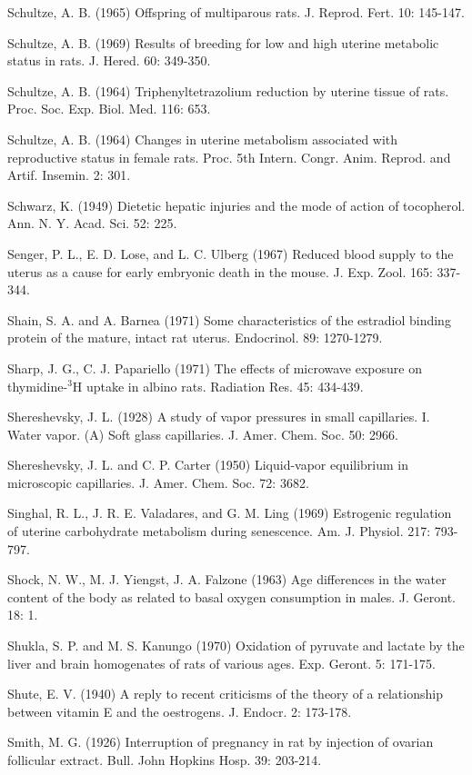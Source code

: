 Schultze, A. B. (1965) Offspring of multiparous rats. J. Reprod. Fert. 10: 145-147.

Schultze, A. B. (1969) Results of breeding for low and high uterine metabolic status in rats. J. Hered. 60: 349-350.

Schultze, A. B. (1964) Triphenyltetrazolium reduction by uterine tissue of rats. Proc. Soc. Exp. Biol. Med. 116: 653.

Schultze, A. B. (1964) Changes in uterine metabolism associated with reproductive status in female rats. Proc. 5th Intern. Congr. Anim. Reprod. and Artif. Insemin. 2: 301.

Schwarz, K. (1949) Dietetic hepatic injuries and the mode of action of tocopherol. Ann. N. Y. Acad. Sci. 52: 225.

Senger, P. L., E. D. Lose, and L. C. Ulberg (1967) Reduced blood supply to the uterus as a cause for early embryonic death in the mouse. J. Exp. Zool. 165: 337-344.

Shain, S. A. and A. Barnea (1971) Some characteristics of the estradiol binding protein of the mature, intact rat uterus. Endocrinol. 89: 1270-1279.

Sharp, J. G., C. J. Papariello (1971) The effects of microwave exposure on thymidine-$^3$H uptake in albino rats. Radiation Res. 45: 434-439.

Shereshevsky, J. L. (1928) A study of vapor pressures in small capillaries. I. Water vapor. (A) Soft glass capillaries. J. Amer. Chem. Soc. 50: 2966.

Shereshevsky, J. L. and C. P. Carter (1950) Liquid-vapor equilibrium in microscopic capillaries. J. Amer. Chem. Soc. 72: 3682.

Singhal, R. L., J. R. E. Valadares, and G. M. Ling (1969) Estrogenic regulation of uterine carbohydrate metabolism during senescence. Am. J. Physiol. 217: 793-797.

Shock, N. W., M. J. Yiengst, J. A. Falzone (1963) Age differences in the water content of the body as related to basal oxygen consumption in males. J. Geront. 18: 1.

Shukla, S. P. and M. S. Kanungo (1970) Oxidation of pyruvate and lactate by the liver and brain homogenates of rats of various ages. Exp. Geront. 5: 171-175.

Shute, E. V. (1940) A reply to recent criticisms of the theory of a relationship between vitamin E and the oestrogens. J. Endocr. 2: 173-178.

Smith, M. G. (1926) Interruption of pregnancy in rat by injection of ovarian follicular extract. Bull. John Hopkins Hosp. 39: 203-214.

